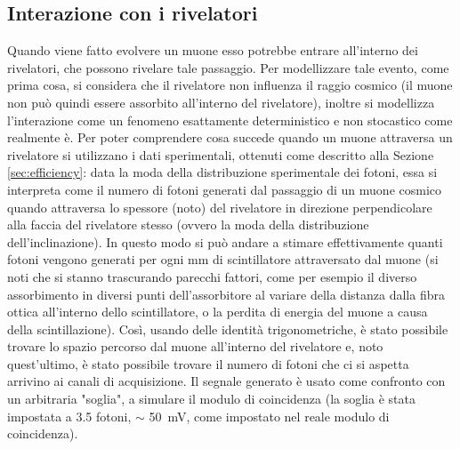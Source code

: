 \subsection{Interazione con i rivelatori}
Quando viene fatto evolvere un muone esso potrebbe entrare all'interno dei rivelatori, che possono rivelare tale passaggio. Per modellizzare tale evento, come prima cosa,
si considera che il rivelatore non influenza il raggio cosmico (il muone non può quindi essere assorbito all'interno del rivelatore), inoltre
si modellizza l'interazione come un fenomeno esattamente deterministico e non stocastico come realmente è. Per poter comprendere cosa succede quando un muone attraversa
un rivelatore si utilizzano i dati sperimentali, ottenuti come descritto alla Sezione \ref{sec:efficiency}: data la moda della distribuzione
sperimentale dei fotoni, essa si interpreta come il numero di fotoni generati dal passaggio di un muone cosmico quando attraversa lo spessore (noto) del rivelatore
in direzione perpendicolare alla faccia del rivelatore stesso (ovvero la moda della distribuzione dell'inclinazione). In questo modo si può andare a stimare effettivamente quanti fotoni vengono generati per ogni mm di scintillatore attraversato dal muone (si noti che si stanno trascurando parecchi fattori, come per esempio il diverso assorbimento in diversi punti dell'assorbitore
al variare della distanza dalla fibra ottica all'interno dello scintillatore, o la perdita di energia del muone a causa della scintillazione). Così, usando delle identità trigonometriche, è stato possibile trovare lo spazio percorso dal muone all'interno del rivelatore e, noto quest'ultimo, è stato possibile trovare il numero di fotoni che ci si aspetta arrivino ai canali di acquisizione. Il segnale generato \`e usato come confronto con un arbitraria "soglia", a simulare il modulo di coincidenza (la soglia \`e stata impostata a 3.5 fotoni, $\sim$ 50~mV, come impostato nel reale modulo di coincidenza).

